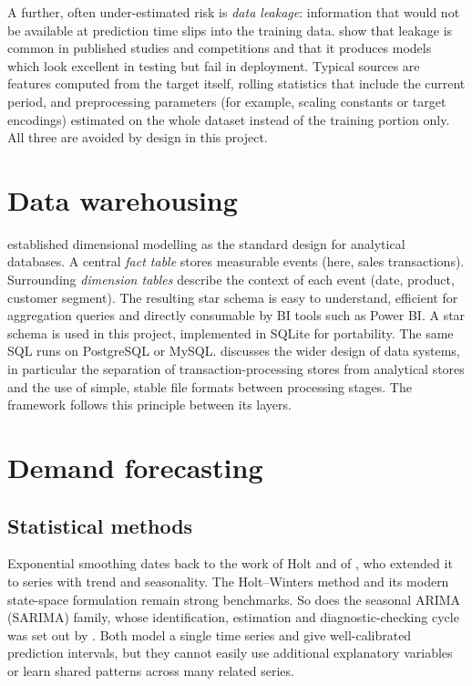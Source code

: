 A further, often under-estimated risk is \emph{data leakage}: information that would not be available at
prediction time slips into the training data. \citet{kaufman2012} show that leakage is common in published
studies and competitions and that it produces models which look excellent in testing but fail in deployment.
Typical sources are features computed from the target itself, rolling statistics that include the current
period, and preprocessing parameters (for example, scaling constants or target encodings) estimated on the
whole dataset instead of the training portion only. All three are avoided by design in this project.

\section{Data warehousing}
\citet{kimball2013} established dimensional modelling as the standard design for analytical databases. A
central \emph{fact table} stores measurable events (here, sales transactions). Surrounding \emph{dimension
tables} describe the context of each event (date, product, customer segment). The resulting star schema is easy
to understand, efficient for aggregation queries and directly consumable by BI tools such as Power BI. A star
schema is used in this project, implemented in SQLite for portability. The same SQL runs on PostgreSQL or MySQL.
\citet{kleppmann2017} discusses the wider design of data systems, in particular the separation of
transaction-processing stores from analytical stores and the use of simple, stable file formats between
processing stages. The framework follows this principle between its layers.

\section{Demand forecasting}
\subsection{Statistical methods}
Exponential smoothing dates back to the work of Holt and of \citet{winters1960}, who extended it to series with
trend and seasonality. The Holt--Winters method and its modern state-space formulation remain strong benchmarks.
So does the seasonal ARIMA (SARIMA) family, whose identification, estimation and diagnostic-checking cycle was
set out by \citet{box2015} \citep[see also][]{hyndman2021}. Both model a single time series and give
well-calibrated prediction intervals, but they cannot easily use additional explanatory variables or learn
shared patterns across many related series.

